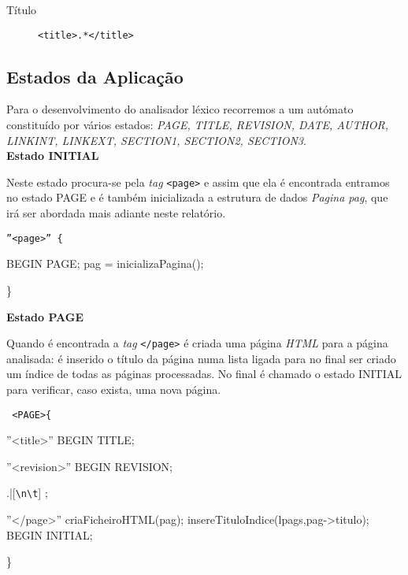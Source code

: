 \documentclass[12pt,letterpaper]{article}
\newcommand*{\escape}[1]{\texttt{\textbackslash#1}}
\begin{document}
\begin{description}
  \item[Título] {\tt <title>.*</title>}
\end{description}

\subsection{Estados da Aplicação}
Para o desenvolvimento do analisador léxico recorremos a um autómato constituído por vários estados: \emph{PAGE, TITLE, REVISION, DATE, AUTHOR, LINKINT, LINKEXT, SECTION1, SECTION2, SECTION3}.\\

{\bf Estado INITIAL}

\par Neste estado procura-se pela {\it tag} {\tt <page>} e assim que ela é encontrada entramos no estado PAGE e é também inicializada a estrutura de dados \emph{Pagina pag}, que irá ser abordada mais adiante neste relatório.\\

{\tt ''<page>'' \{ \par \hspace{1cm} BEGIN PAGE; pag = inicializaPagina(); \par \}\\}


\newpage
{\bf Estado PAGE}


\par Quando é encontrada a {\it tag} {\tt </page>} é criada uma página {\it HTML} para a página analisada: é inserido o título da página numa lista ligada para no final ser criado um índice de todas as páginas processadas. No final é chamado o estado INITIAL para verificar, caso exista, uma nova página.\\
 
{\tt 
<PAGE>\{ \par
\hspace{1cm}	''<title>'' \hspace{1.65cm} BEGIN TITLE; \par
\hspace{1cm}    ''<revision>'' \hspace{1.05cm} BEGIN REVISION; \par
\hspace{1cm}    .|[\escape{n}\escape{t}] \hspace{1.75cm} ; \par
\hspace{1cm}	''</page>'' \hspace{1.65cm} criaFicheiroHTML(pag); insereTituloIndice(lpags,pag->titulo); BEGIN INITIAL; \par
\}\\}
\end{document}
